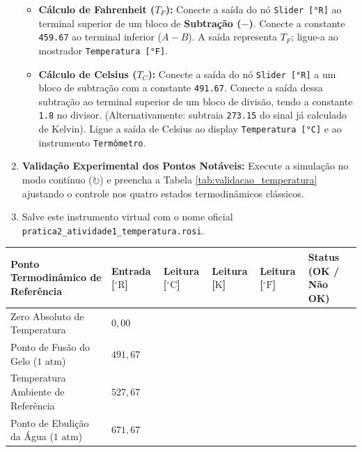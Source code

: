 \documentclass[11pt,a4paper]{article}
\begin{document}
\begin{enumerate}
\begin{itemize}
        \item \textbf{Cálculo de Fahrenheit ($T_F$):} Conecte a saída do nó \texttt{Slider [°R]} ao terminal superior de um bloco de \textbf{Subtração ($-$)}. Conecte a constante \texttt{459.67} ao terminal inferior ($A - B$). A saída representa $T_F$; ligue-a ao mostrador \texttt{Temperatura [°F]}.
        \item \textbf{Cálculo de Celsius ($T_C$):} Conecte a saída do nó \texttt{Slider [°R]} a um bloco de subtração com a constante \texttt{491.67}. Conecte a saída dessa subtração ao terminal superior de um bloco de divisão, tendo a constante \texttt{1.8} no divisor. (Alternativamente: subtraia \texttt{273.15} do sinal já calculado de Kelvin). Ligue a saída de Celsius ao display \texttt{Temperatura [°C]} e ao instrumento \texttt{Termômetro}.
    \end{itemize}
    \item \textbf{Validação Experimental dos Pontos Notáveis:}
    Execute a simulação no modo contínuo ($\circlearrowright$) e preencha a Tabela \ref{tab:validacao_temperatura} ajustando o controle nos quatro estados termodinâmicos clássicos.
    \item Salve este instrumento virtual com o nome oficial \texttt{pratica2\_atividade1\_temperatura.rosi}.
\end{enumerate}

\begin{center}
\label{tab:validacao_temperatura}
\scriptsize
\renewcommand{\arraystretch}{0.95}
\begin{tabularx}{\textwidth}{L{4.2cm} Y C{2.2cm} C{2.2cm} C{2.2cm} Y}
\toprule
\textbf{Ponto Termodinâmico de Referência} & \textbf{Entrada [$^\circ\text{R}$]} & \textbf{Leitura [$^\circ\text{C}$]} & \textbf{Leitura [$\text{K}$]} & \textbf{Leitura [$^\circ\text{F}$]} & \textbf{Status (OK / Não OK)} \\
\midrule
Zero Absoluto de Temperatura & $0{,}00$ & & & & \\
Ponto de Fusão do Gelo ($1\text{ atm}$) & $491{,}67$ & & & & \\
Temperatura Ambiente de Referência & $527{,}67$ & & & & \\
Ponto de Ebulição da Água ($1\text{ atm}$) & $671{,}67$ & & & & \\
\bottomrule
\end{tabularx}
\end{center}

\vspace{0.05cm}
\end{document}
